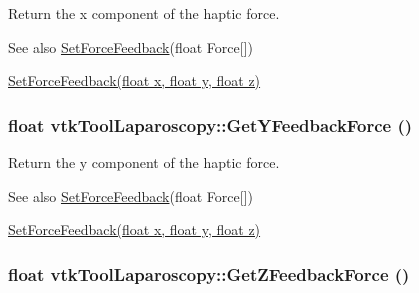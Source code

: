 Return the x component of the haptic force. \begin{DoxySeeAlso}{See also}
\hyperlink{classvtkToolLaparoscopy_a9bbfa040ca224472e6c669a3c27d9977}{SetForceFeedback}(float Force\mbox{[}\mbox{]}) 

\hyperlink{classvtkToolLaparoscopy_aa716d470104640646068eaa160a7adf2}{SetForceFeedback(float x, float y, float z)} 
\end{DoxySeeAlso}
\hypertarget{classvtkToolLaparoscopy_a44acfb672a0526b9628372c19249c41c}{
\subsubsection[{GetYFeedbackForce}]{\setlength{\rightskip}{0pt plus 5cm}float vtkToolLaparoscopy::GetYFeedbackForce ()}}
\label{classvtkToolLaparoscopy_a44acfb672a0526b9628372c19249c41c}


Return the y component of the haptic force. \begin{DoxySeeAlso}{See also}
\hyperlink{classvtkToolLaparoscopy_a9bbfa040ca224472e6c669a3c27d9977}{SetForceFeedback}(float Force\mbox{[}\mbox{]}) 

\hyperlink{classvtkToolLaparoscopy_aa716d470104640646068eaa160a7adf2}{SetForceFeedback(float x, float y, float z)} 
\end{DoxySeeAlso}
\hypertarget{classvtkToolLaparoscopy_a2743b59822a1b2b2d8c04f45dca44e32}{
\subsubsection[{GetZFeedbackForce}]{\setlength{\rightskip}{0pt plus 5cm}float vtkToolLaparoscopy::GetZFeedbackForce ()}}
\label{classvtkToolLaparoscopy_a2743b59822a1b2b2d8c04f45dca44e32}


